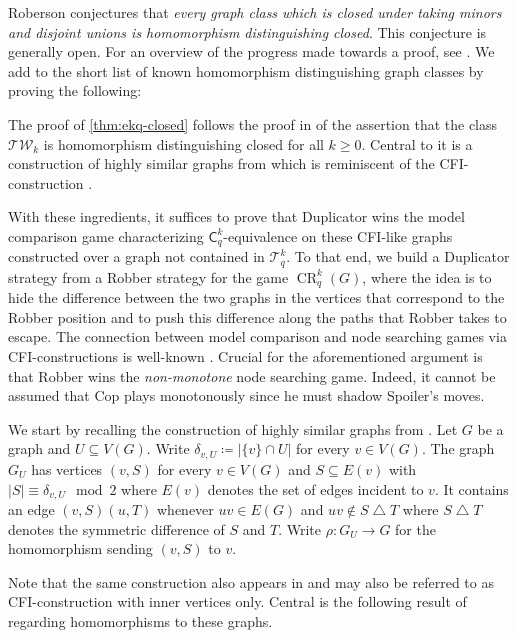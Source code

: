 \documentclass{lmcs}
\theoremstyle{plain}\newtheorem{claim}[thm]{Claim}   %
\newcommand{\cT}{\ensuremath{\mathcal T}}
\DeclareMathOperator{\CR}{CR}
\newcommand{\CRkq}{\CR^k_q}
\newcommand{\symdiff}{\ensuremath{\mathbin{\triangle}}}
\newcommand{\Ekq}{\ensuremath{\cT_{q}^{k}}}
\begin{document}
Roberson conjectures that \emph{every graph class which is closed under taking minors and disjoint unions is homomorphism distinguishing closed}.
This conjecture is generally open.
For an overview of the progress made towards a proof, see
\cite[Chapter~6]{seppelt_homomorphism_2024}.
We add to the short list of known homomorphism distinguishing graph classes by proving the following:

\tdclosed*

\ekqclosed*

The proof of \autoref{thm:ekq-closed} follows the proof in \cite{neuen_homomorphism-distinguishing_2023} of the assertion that the class $\mathcal{TW}_{k}$ is homomorphism distinguishing closed for all $k \geq 0$.
Central to it is a construction of highly similar graphs from \cite{roberson_oddomorphisms_2022} which is reminiscent of the CFI-construction \cite{Cai_optimal_1992}.

With these ingredients, it suffices to prove that Duplicator wins the model comparison game characterizing $\mathsf{C}^k_q$-equivalence on these CFI-like graphs constructed over a graph not contained in \Ekq.
To that end, we build a Duplicator strategy from a Robber strategy for the game $\CRkq(G)$, where the idea is to hide the difference between the two graphs in the vertices that correspond to the Robber position and to push this difference along the paths that Robber takes to escape.
The connection between model comparison and node searching games via CFI-constructions is well-known \cite{Dawar_power_2007, Hella_logical_1996}.
Crucial for the aforementioned argument is that Robber wins the \emph{non-monotone} node searching game.
Indeed, it cannot be assumed that Cop plays monotonously since he must shadow Spoiler's moves.

We start by recalling the construction of highly similar graphs from \cite{roberson_oddomorphisms_2022}.
Let $G$ be a graph and $U \subseteq V(G)$.
Write $\delta_{v, U} \coloneqq |\{v\} \cap U|$ for every $v\in V(G)$.
The graph $G_U$ has vertices $(v, S)$ for every $v \in V(G)$ and $S \subseteq E(v)$ with $|S| \equiv \delta_{v, U} \mod 2$ where $E(v)$ denotes the set of edges incident to $v$.
It contains an edge $(v, S)(u, T)$ whenever $uv \in E(G)$ and $uv \not\in S \symdiff T$ where $S\symdiff T$ denotes the symmetric difference of $S$ and $T$.
Write $\rho \colon G_U \to G$ for the homomorphism sending $(v, S)$ to $v$.

Note that the same construction also appears in \cite{Furer_rounds_2001} and may also be referred to as CFI-construction with inner vertices only.
Central is the following result of \cite{roberson_oddomorphisms_2022} regarding homomorphisms to these graphs.
\end{document}
